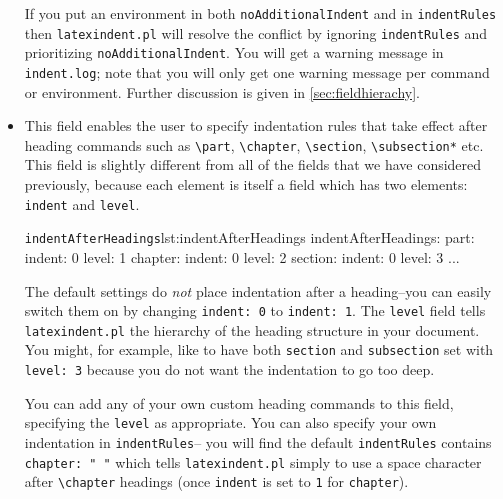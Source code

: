 \documentclass[11pt]{article}
\newcommand{\verbitem}[1]{\small\ttfamily{#1}}
\begin{document}
\begin{itemize}
	If you put an environment in both \lstinline!noAdditionalIndent! and in
	\lstinline!indentRules! then \lstinline!latexindent.pl! will resolve the conflict
	by ignoring \lstinline!indentRules! and prioritizing \lstinline!noAdditionalIndent!.
	You will get a warning message in \lstinline!indent.log!; note that you will only
	get one warning message per command or environment. Further discussion
	is given in \cref{sec:fieldhierachy}.

	\item[\verbitem{indentAfterHeadings}] This field enables the user to specify
		indentation rules that take effect after heading commands such as \lstinline!\part!, \lstinline!\chapter!,
		\lstinline!\section!, \lstinline!\subsection*! etc. This field is slightly different from all
		of the fields that we have considered previously, because each element is
		itself a field which has two elements: \lstinline!indent! and \lstinline!level!.
		\begin{cmhlistings}[style=yaml]{\lstinline!indentAfterHeadings!}{lst:indentAfterHeadings}
indentAfterHeadings:
    part:
       indent: 0
       level: 1
    chapter:
       indent: 0
       level: 2
    section:
       indent: 0
       level: 3
    ...
	\end{cmhlistings}
	The default settings do \emph{not} place indentation after a heading--you
	can easily switch them on by changing \lstinline!indent: 0! to \lstinline!indent: 1!.
	The \lstinline!level! field tells \lstinline!latexindent.pl! the hierarchy of the heading
	structure in your document. You might, for example, like to have both \lstinline!section!
	and \lstinline!subsection! set with \lstinline!level: 3! because you do not want the indentation to go too deep.

	You can add any of your own custom heading commands to this field, specifying the \lstinline!level!
	as appropriate.  You can also specify your own indentation in \lstinline!indentRules!--
	you will find the default \lstinline!indentRules! contains \lstinline!chapter: " "! which
	tells \lstinline!latexindent.pl! simply to use a space character after \lstinline!\chapter! headings
	(once \lstinline!indent! is set to \lstinline!1! for \lstinline!chapter!).


\end{itemize}
\end{document}

